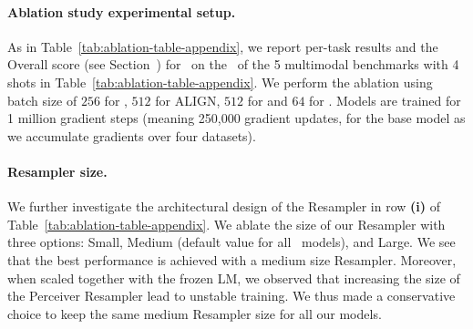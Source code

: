 \label{app:full_ablations}



\paragraph{Ablation study experimental setup.} As in Table~\ref{tab:ablation-table-appendix}, we report per-task results and the Overall score (see Section~) for \base{}~on the \metadevsubsets~of the 5 \dev{} multimodal benchmarks with 4 shots in Table~\ref{tab:ablation-table-appendix}.
We perform the ablation using batch size of $256$ for \mmmw{}, $512$ for ALIGN, $512$ for \shortimagetextpairs{} and $64$ for \shortvideotextpairs.
Models are trained for 1 million gradient steps (meaning 250,000 gradient updates, for the base model as we accumulate gradients over four datasets).


\paragraph{Resampler size.}
We further investigate the architectural design of the Resampler in row \textbf{(i)} of Table~\ref{tab:ablation-table-appendix}.
We ablate the size of our Resampler with three options: Small, Medium (default value for all~\method{} models), and Large.
We see that the best performance is achieved with a medium size Resampler.
Moreover, when scaled together with the frozen LM, we observed that increasing the size of the Perceiver Resampler lead to unstable training.
We thus made a conservative choice to keep the same medium Resampler size for all our \method{} models.

